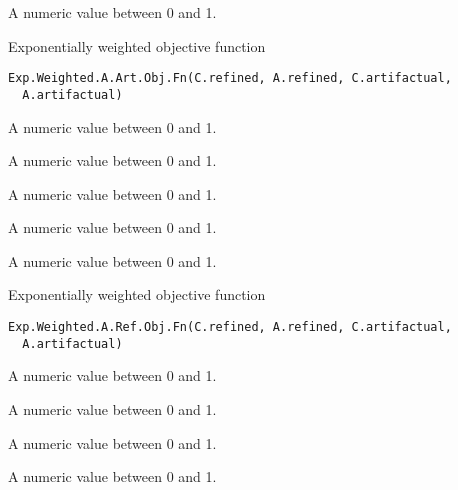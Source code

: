 \documentclass[letterpaper]{book}
\begin{document}
%
\begin{Value}
A numeric value between 0 and 1.
\end{Value}
%
\begin{Description}\relax
Exponentially weighted objective function
\end{Description}
%
\begin{Usage}
\begin{verbatim}
Exp.Weighted.A.Art.Obj.Fn(C.refined, A.refined, C.artifactual,
  A.artifactual)
\end{verbatim}
\end{Usage}
%
\begin{Arguments}
\begin{ldescription}
\item[\code{C.refined}] A numeric value between 0 and 1.

\item[\code{A.refined}] A numeric value between 0 and 1.

\item[\code{C.artifactual}] A numeric value between 0 and 1.

\item[\code{A.artifactual}] A numeric value between 0 and 1.
\end{ldescription}
\end{Arguments}
%
\begin{Value}
A numeric value between 0 and 1.
\end{Value}
%
\begin{Description}\relax
Exponentially weighted objective function
\end{Description}
%
\begin{Usage}
\begin{verbatim}
Exp.Weighted.A.Ref.Obj.Fn(C.refined, A.refined, C.artifactual,
  A.artifactual)
\end{verbatim}
\end{Usage}
%
\begin{Arguments}
\begin{ldescription}
\item[\code{C.refined}] A numeric value between 0 and 1.

\item[\code{A.refined}] A numeric value between 0 and 1.

\item[\code{C.artifactual}] A numeric value between 0 and 1.

\item[\code{A.artifactual}] A numeric value between 0 and 1.
\end{ldescription}
\end{Arguments}
\end{document}
